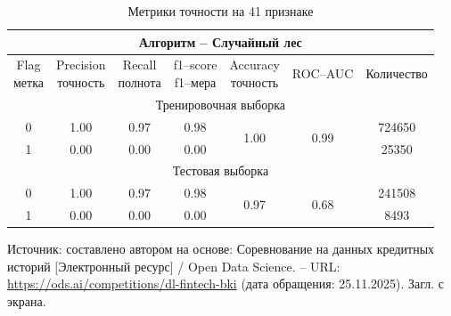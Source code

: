 \begin{center}
  \begin{longtable}{|c|c|c|c|c|c|c|}
    \caption{Метрики точности на 41 признаке }
    \label{metrics_41} \\
    \hline
    \multicolumn{7}{|c|}{Алгоритм -- Случайный лес}\\
    \hline
    \rowcolor[gray]{.9}
    \specialcell{Flag\\метка} &
    \specialcell{Precision\\точность} &
    \specialcell{Recall\\полнота} &
    \specialcell{f1--score\\f1--мера} &
    \specialcell{Accuracy\\точность}  &
    ROC--AUC &
    Количество    \\
    \hline
    \multicolumn{7}{|c|}{Тренировочная выборка}\\
    \hline
    0 & 1.00 & 0.97 & 0.98 &
    \multirow{2}{*}{1.00} &   
    \multirow{2}{*}{0.99} &  
    724650 \\                    
    \cline{1-4} \cline{7-7}
    1 & 0.00 & 0.00 & 0.00 &  
      &      & 25350 \\       
    \hline
    \multicolumn{7}{|c|}{Тестовая выборка} \\
    \hline
    0 & 1.00 & 0.97 & 0.98 &
    \multirow{2}{*}{0.97} &
    \multirow{2}{*}{0.68} &
    241508 \\
    \cline{1-4} \cline{7-7}
    1 & 0.00 & 0.00 & 0.00 & & & 8493 \\
    \hline
  \end{longtable}
  \begin{minipage}{\textwidth}
    \fontsize{9}{11}\selectfont
    \justifying
    Источник: составлено автором на основе: Соревнование на данных кредитных историй [Электронный ресурс] / Open Data Science. -- URL: \url{https://ods.ai/competitions/dl-fintech-bki} (дата обращения: 25.11.2025). Загл. с экрана.
  \end{minipage}
\end{center}


